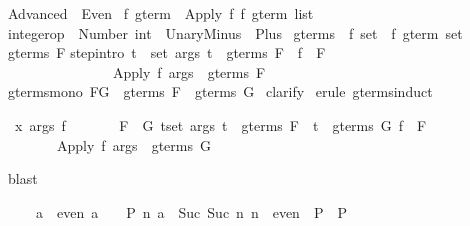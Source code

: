 %
\begin{isabellebody}%
\def\isabellecontext{Advanced}%
\isanewline
{}\ Advanced\ {\isacharequal}\ Even{\isacharcolon}\isanewline
\isanewline
\isanewline
{}\ {\isacharprime}f\ gterm\ {\isacharequal}\ Apply\ {\isacharprime}f\ {\isachardoublequote}{\isacharprime}f\ gterm\ list{\isachardoublequote}\isanewline
\isanewline
{}\ integer{\isacharunderscore}op\ {\isacharequal}\ Number\ int\ {\isacharbar}\ UnaryMinus\ {\isacharbar}\ Plus\isanewline
\isanewline
{}\ gterms\ {\isacharcolon}{\isacharcolon}\ {\isachardoublequote}{\isacharprime}f\ set\ {\isasymRightarrow}\ {\isacharprime}f\ gterm\ set{\isachardoublequote}\isanewline
{}\ {\isachardoublequote}gterms\ F{\isachardoublequote}\isanewline
{}\isanewline
step{\isacharbrackleft}intro{\isacharbang}{\isacharbrackright}{\isacharcolon}\ {\isachardoublequote}{\isasymlbrakk}{\isasymforall}t\ {\isasymin}\ set\ args{\isachardot}\ t\ {\isasymin}\ gterms\ F{\isacharsemicolon}\ \ f\ {\isasymin}\ F{\isasymrbrakk}\isanewline
\ \ \ \ \ \ \ \ \ \ \ \ \ \ \ {\isasymLongrightarrow}\ {\isacharparenleft}Apply\ f\ args{\isacharparenright}\ {\isasymin}\ gterms\ F{\isachardoublequote}\isanewline
\isanewline
{}\ gterms{\isacharunderscore}mono{\isacharcolon}\ {\isachardoublequote}F{\isasymsubseteq}G\ {\isasymLongrightarrow}\ gterms\ F\ {\isasymsubseteq}\ gterms\ G{\isachardoublequote}\isanewline
{}\ clarify\isanewline
{}\ {\isacharparenleft}erule\ gterms{\isachardot}induct{\isacharparenright}%
\begin{isamarkuptxt}%
\begin{isabelle}%
\ {}{\isachardot}\ {\isasymAnd}x\ args\ f{\isachardot}\isanewline
\ \ \ \ \ \ \ {\isasymlbrakk}F\ {\isasymsubseteq}\ G{\isacharsemicolon}\ {\isasymforall}t{\isasymin}set\ args{\isachardot}\ t\ {\isasymin}\ gterms\ F\ {\isasymand}\ t\ {\isasymin}\ gterms\ G{\isacharsemicolon}\ f\ {\isasymin}\ F{\isasymrbrakk}\isanewline
\ \ \ \ \ \ \ {\isasymLongrightarrow}\ Apply\ f\ args\ {\isasymin}\ gterms\ G%
\end{isabelle}%
\end{isamarkuptxt}%
\ blast\isanewline
{}%
\begin{isamarkuptext}%
\begin{isabelle}%
\ \ \ \ \ {\isasymlbrakk}a\ {\isasymin}\ even{\isacharsemicolon}\ a\ {\isacharequal}\ {}\ {\isasymLongrightarrow}\ P{\isacharsemicolon}\ {\isasymAnd}n{\isachardot}\ {\isasymlbrakk}a\ {\isacharequal}\ Suc\ {\isacharparenleft}Suc\ n{\isacharparenright}{\isacharsemicolon}\ n\ {\isasymin}\ even{\isasymrbrakk}\ {\isasymLongrightarrow}\ P{\isasymrbrakk}\ {\isasymLongrightarrow}\ P%
\end{isabelle}


\end{isamarkuptext}
\end{isabellebody}

